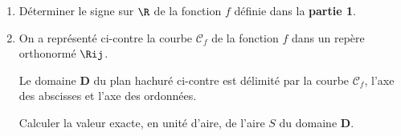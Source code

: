 \smallskip

\begin{enumerate}
	\item Déterminer le signe sur $\R$ de la fonction $f$ définie dans la \textbf{partie 1}.
	\item On a représenté ci-contre la courbe $\mathcal{C}_{f}$ de la fonction $f$ dans un repère orthonormé $\Rij$.
	
	\smallskip
	
	Le domaine $\bm{D}$ du plan hachuré ci-contre est délimité par la courbe $\mathcal{C}_{f}$, l'axe des abscisses et l'axe des ordonnées.
	
	Calculer la valeur exacte, en unité d'aire, de l'aire $S$ du domaine $\bm{D}$.
\end{enumerate}